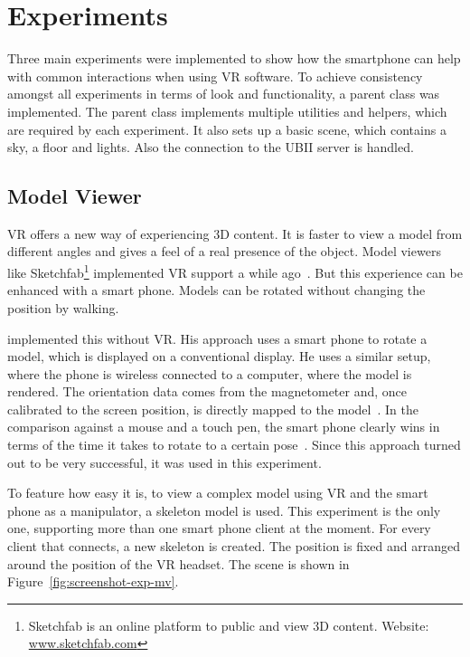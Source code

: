 \section{Experiments}\label{section:experiments}

Three main experiments were implemented to show how the smartphone can help with common interactions when using \ac{VR} software.
To achieve consistency amongst all experiments in terms of look and functionality, a parent class was implemented. The parent class implements multiple utilities and helpers, which are required by each experiment. It also sets up a basic scene, which contains a sky, a floor and lights.  Also the connection to the \ac{UBII} server is handled. 


\subsection{Model Viewer}\label{subsection:model-viewer}

\acf{VR} offers a new way of experiencing \ac{3D} content. It is faster to view a model from different angles and gives a feel of a real presence of the object. Model viewers like Sketchfab\footnote{Sketchfab is an online platform to public and view 3D content. Website: \href{https://sketchfab.com}{www.sketchfab.com}} implemented \ac{VR} support a while ago~\cite{AlbanDenoyel.2016}. But this experience can be enhanced with a smart phone. Models can be rotated without changing the position by walking.

\citeauthor{Katzakis.2010} implemented this without \ac{VR}. His approach uses a smart phone to rotate a model, which is displayed on a conventional display. He uses a similar setup, where the phone is wireless connected to a computer, where the model is rendered. The orientation data comes from the magnetometer and, once calibrated to the screen position, is directly mapped to the model~\cite[139]{Katzakis.2010}. In the comparison against a mouse and a touch pen, the smart phone clearly wins in terms of the time it takes to rotate to a certain pose~\cite[140]{Katzakis.2010}. 
Since this approach turned out to be very successful, it was used in this experiment. 

To feature how easy it is, to view a complex model using VR and the smart phone as a manipulator, a skeleton model is used. This experiment is the only one, supporting more than one smart phone client at the moment. For every client that connects, a new skeleton is created. The position is fixed and arranged around the position of the \ac{VR} headset. The scene is shown in Figure~\ref{fig:screenshot-exp-mv}.

